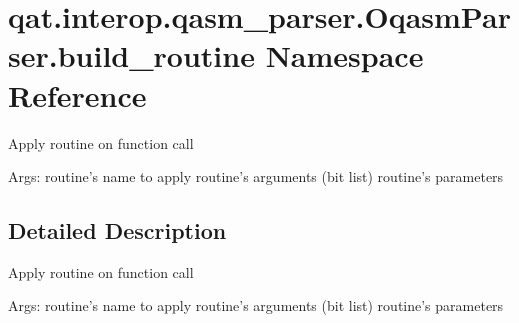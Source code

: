 \hypertarget{namespaceqat_1_1interop_1_1qasm__parser_1_1OqasmParser_1_1build__routine}{\section{qat.\-interop.\-qasm\-\_\-parser.\-Oqasm\-Parser.\-build\-\_\-routine Namespace Reference}
\label{namespaceqat_1_1interop_1_1qasm__parser_1_1OqasmParser_1_1build__routine}
}


\begin{DoxyVerb}Apply routine on function call
\end{DoxyVerb}
 Args\-: routine's name to apply routine's arguments (bit list) routine's parameters  




\subsection{Detailed Description}
\begin{DoxyVerb}Apply routine on function call
\end{DoxyVerb}
 Args\-: routine's name to apply routine's arguments (bit list) routine's parameters 